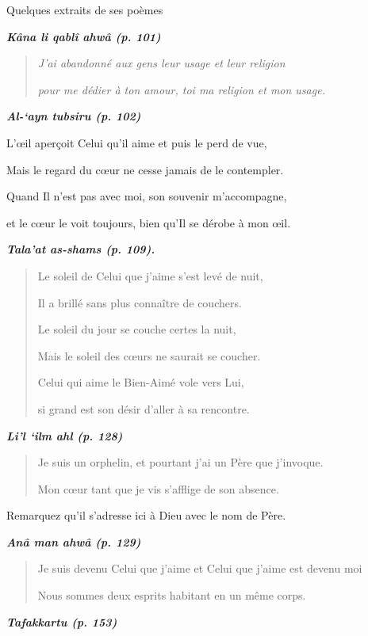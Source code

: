 Quelques extraits de ses poèmes

\emph{\textbf{Kâna li qablî ahwâ (p. 101)}}

\begin{quote}
\emph{J'ai abandonné aux gens leur usage et leur religion}

\emph{pour me dédier à ton amour, toi ma religion et mon usage.}
\end{quote}

\emph{\textbf{Al-`ayn tubsiru (p. 102)}}

L'œil aperçoit Celui qu'il aime et puis le perd de vue,

Mais le regard du cœur ne cesse jamais de le contempler.

Quand Il n'est pas avec moi, son souvenir m'accompagne,

et le cœur le voit toujours, bien qu'Il se dérobe à mon œil.

\emph{\textbf{Tala'at as-shams (p. 109).}}

\begin{quote}
Le soleil de Celui que j'aime s'est levé de nuit,

Il a brillé sans plus connaître de couchers.

Le soleil du jour se couche certes la nuit,

Mais le soleil des cœurs ne saurait se coucher.

Celui qui aime le Bien-Aimé vole vers Lui,

si grand est son désir d'aller à sa rencontre.
\end{quote}

\emph{\textbf{Li'l `ilm ahl (p. 128)}}

\begin{quote}
Je suis un orphelin, et pourtant j'ai un Père que j'invoque.

Mon cœur tant que je vis s'afflige de son absence.
\end{quote}

Remarquez qu'il s'adresse ici à Dieu avec le nom de Père.

\emph{\textbf{Anâ man ahwâ (p. 129)}}

\begin{quote}
Je suis devenu Celui que j'aime et Celui que j'aime est devenu moi

Nous sommes deux esprits habitant en un même corps.
\end{quote}

\emph{\textbf{Tafakkartu (p. 153)}}


